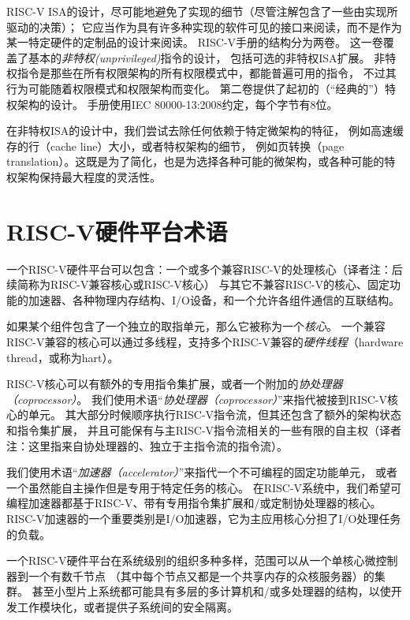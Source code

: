 RISC-V ISA的设计，尽可能地避免了实现的细节（尽管注解包含了一些由实现所驱动的决策）；
它应当作为具有许多种实现的软件可见的接口来阅读，而不是作为某一特定硬件的定制品的设计来阅读。
RISC-V手册的结构分为两卷。
这一卷覆盖了基本的{\em 非特权(unprivileged)}指令的设计，
包括可选的非特权ISA扩展。
非特权指令是那些在所有权限架构的所有权限模式中，都能普遍可用的指令，
不过其行为可能随着权限模式和权限架构而变化。
第二卷提供了起初的（“经典的”）特权架构的设计。
手册使用IEC 80000-13:2008约定，每个字节有8位。


\begin{commentary}
  在非特权ISA的设计中，我们尝试去除任何依赖于特定微架构的特征，
  例如高速缓存的行（cache line）大小，或者特权架构的细节，
  例如页转换（page translation）。这既是为了简化，也是为选择各种可能的微架构，或各种可能的特权架构保持最大程度的灵活性。
\end{commentary}


\section{RISC-V硬件平台术语}

一个RISC-V硬件平台可以包含：一个或多个兼容RISC-V的处理核心（译者注：后续简称为RISC-V兼容核心或RISC-V核心）
与其它不兼容RISC-V的核心、固定功能的加速器、各种物理内存结构、I/O设备，和一个允许各组件通信的互联结构。

如果某个组件包含了一个独立的取指单元，那么它被称为一个{\em 核心}。
一个兼容RISC-V兼容的核心可以通过多线程，支持多个RISC-V兼容的{\em 硬件线程}（hardware thread，或称为hart）。

RISC-V核心可以有额外的专用指令集扩展，或者一个附加的{\em 协处理器（coprocessor）}。
我们使用术语“{\em 协处理器（coprocessor）}”来指代被接到RISC-V核心的单元。
其大部分时候顺序执行RISC-V指令流，但其还包含了额外的架构状态和指令集扩展，
并且可能保有与主RISC-V指令流相关的一些有限的自主权（译者注：这里指来自协处理器的、独立于主指令流的指令流）。

我们使用术语“{\em 加速器（accelerator）}”来指代一个不可编程的固定功能单元，
或者一个虽然能自主操作但是专用于特定任务的核心。
在RISC-V系统中，我们希望可编程加速器都基于RISC-V、带有专用指令集扩展和/或定制协处理器的核心。
RISC-V加速器的一个重要类别是I/O加速器，它为主应用核心分担了I/O处理任务的负载。

一个RISC-V硬件平台在系统级别的组织多种多样，范围可以从一个单核心微控制器到一个有数千节点
（其中每个节点又都是一个共享内存的众核服务器）的集群。
甚至小型片上系统都可能具有多层的多计算机和/或多处理器的结构，以使开发工作模块化，或者提供子系统间的安全隔离。

